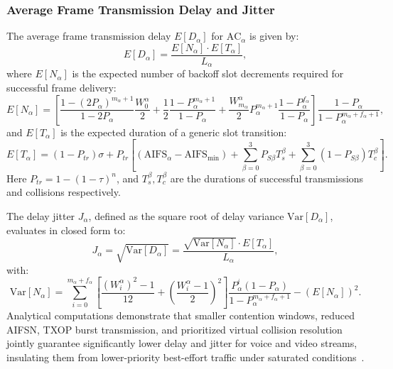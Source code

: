 \subsubsection{Average Frame Transmission Delay and Jitter}
The average frame transmission delay $E[D_\alpha]$ for $\mathrm{AC}_\alpha$ is given by:
\begin{equation}
    E[D_\alpha] = \frac{E[N_\alpha] \cdot E[T_\alpha]}{L_\alpha},
\end{equation}
where $E[N_\alpha]$ is the expected number of backoff slot decrements required for successful frame delivery:
\begin{equation}
    E[N_\alpha] = \left[ \frac{1 - (2P_\alpha)^{m_\alpha+1}}{1 - 2P_\alpha}\frac{W_0^\alpha}{2} + \frac{1}{2}\frac{1 - P_\alpha^{m_\alpha+1}}{1 - P_\alpha} + \frac{W_{m_\alpha}^\alpha}{2} P_\alpha^{m_\alpha+1}\frac{1 - P_\alpha^{f_\alpha}}{1 - P_\alpha} \right] \frac{1 - P_\alpha}{1 - P_\alpha^{m_\alpha + f_\alpha + 1}},
\end{equation}
and $E[T_\alpha]$ is the expected duration of a generic slot transition:
\begin{equation}
    E[T_\alpha] = (1 - P_{tr})\sigma + P_{tr} \left[ (\mathrm{AIFS}_\alpha - \mathrm{AIFS}_{\min}) + \sum_{\beta=0}^3 P_{S\beta} T_s^\beta + \sum_{\beta=0}^3 (1 - P_{S\beta}) T_c^\beta \right].
\end{equation}
Here $P_{tr} = 1 - (1 - \tau)^n$, and $T_s^\beta, T_c^\beta$ are the durations of successful transmissions and collisions respectively.

The delay jitter $J_\alpha$, defined as the square root of delay variance $\mathrm{Var}[D_\alpha]$, evaluates in closed form to:
\begin{equation}
    J_\alpha = \sqrt{\mathrm{Var}[D_\alpha]} = \frac{\sqrt{\mathrm{Var}[N_\alpha]} \cdot E[T_\alpha]}{L_\alpha},
\end{equation}
with:
\begin{equation}
    \mathrm{Var}[N_\alpha] = \sum_{i=0}^{m_\alpha + f_\alpha} \left[ \frac{(W_i^\alpha)^2 - 1}{12} + \left( \frac{W_i^\alpha - 1}{2} \right)^2 \right] \frac{P_\alpha^i (1 - P_\alpha)}{1 - P_\alpha^{m_\alpha + f_\alpha + 1}} - (E[N_\alpha])^2.
\end{equation}
Analytical computations demonstrate that smaller contention windows, reduced AIFSN, TXOP burst transmission, and prioritized virtual collision resolution jointly guarantee significantly lower delay and jitter for voice and video streams, insulating them from lower-priority best-effort traffic under saturated conditions~\cite{sitaram80211e}.


